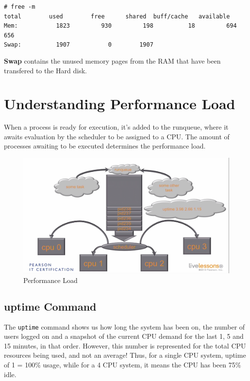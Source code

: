 \vspace{-15pt}
\begin{verbatim}
# free -m
total        used        free      shared  buff/cache   available
Mem:           1823         930         198          18         694         656
Swap:          1907           0        1907
\end{verbatim}
\vspace{-10pt}

\textbf{Swap} contains the unused memory pages from the RAM that have been transfered to the Hard disk. 

	\section{Understanding Performance Load}
When a process is ready for execution, it's added to the runqueue, where it awaits evaluation by the scheduler to be assigned to a CPU. The amount of processes awaiting to be executed determines the performance load. 

\begin{figure}[H]
	\centering
	\includegraphics[width=0.9\linewidth]{RHCSA/Mod2/chapters/2.10.a}
	\caption{Performance Load}
	\label{fig:2}
\end{figure}

\subsection{uptime Command}
The \verb|uptime| command shows us how long the system has been on, the number of users logged on and a snapshot of the current CPU demand for the last 1, 5 and 15 minutes, in that order. However, this number is represented for the total CPU resources being used, and not an average! Thus, for a single CPU system, uptime of 1 = 100\% usage, while for a 4 CPU system, it means the CPU has been 75\% idle. 

